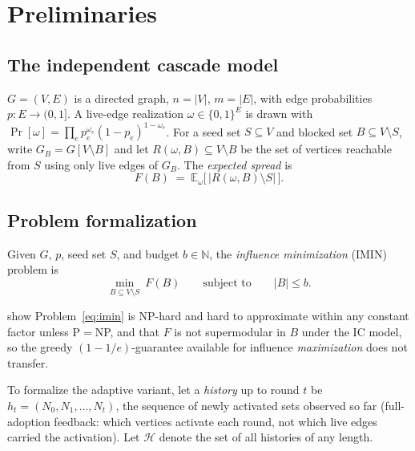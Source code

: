 \documentclass[ijoc,sglanonrev]{informs4}
\newcommand{\Rspread}{R}
\newcommand{\FF}{F}
\begin{document}
\section{Preliminaries}\label{sec:prelim}

\subsection{The independent cascade model}\label{sec:ic-model}

$G=(V,E)$ is a directed graph,
$n=|V|$, $m=|E|$, with edge probabilities $p:E\to(0,1]$. A live-edge
realization $\omega\in\{0,1\}^E$ is drawn with
$\Pr[\omega]=\prod_{e}p_e^{\omega_e}(1-p_e)^{1-\omega_e}$. For a seed set
$S\subseteq V$ and blocked set $B\subseteq V\setminus S$, write
$G_B=G[V\setminus B]$ and let $\Rspread(\omega,B)\subseteq V\setminus B$ be
the set of vertices reachable from $S$ using only live edges of $G_B$. The
\emph{expected spread} is
\begin{equation}\label{eq:spread}
\FF(B)\;=\;\mathbb E_\omega\bigl[\,|\Rspread(\omega,B)\setminus S|\,\bigr].
\end{equation}

\subsection{Problem formalization}\label{sec:formalization}

\begin{definition}\label{def:imin}
Given $G$, $p$, seed set $S$, and budget $b\in\mathbb N$, the
\emph{influence minimization} (IMIN) problem is
\begin{equation}\label{eq:imin}
\min_{B\subseteq V\setminus S}\ \FF(B)
\qquad\text{subject to}\qquad
|B|\le b.
\end{equation}
\end{definition}

\noindent \citet{xie2023} show Problem~\eqref{eq:imin} is NP-hard and hard
to approximate within any constant factor unless P$=$NP, and that $\FF$ is
not supermodular in $B$ under the IC model, so the greedy
$(1-1/e)$-guarantee available for influence \emph{maximization}
\citep{kempe2003} does not transfer.

To formalize the adaptive variant, let a \emph{history} up to round $t$ be
$h_t=(N_0,N_1,\dots,N_t)$, the sequence of newly activated sets observed so
far (full-adoption feedback: which vertices activate each round, not which
live edges carried the activation). Let $\mathcal H$ denote the set of all
histories of any length.
\end{document}
